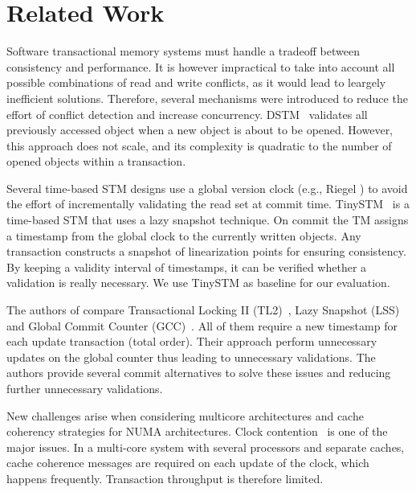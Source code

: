 \section{Related Work}

Software transactional memory systems must handle a tradeoff between consistency and performance.
It is however impractical to take into account all possible combinations of read and write conflicts, as it would lead to leargely inefficient solutions. 
Therefore, several mechanisms were introduced to reduce the effort of conflict detection and increase concurrency. 
DSTM~\cite{herlihy2003software} validates all previously accessed object when a new object is about to be opened. 
However, this approach does not scale, and its complexity is quadratic to the number of opened objects within a transaction.

Several time-based STM designs use a global version clock (e.g., Riegel \cite{riegel2006lazy}) to avoid the effort of incrementally validating the read set at commit time. 
TinySTM~\cite{FelberFMR10} is a time-based STM that uses a lazy snapshot technique. 
On commit the TM assigns a timestamp from the global clock to the currently written objects. 
Any transaction constructs a snapshot of linearization points for ensuring consistency. 
By keeping a validity interval of timestamps, it can be verified whether a validation is really necessary. 
We use TinySTM as baseline for our evaluation.

The authors of \cite{zhang2008commit} compare Transactional Locking II (TL2)~\cite{dice2006transactional}, Lazy Snapshot (LSS)\cite{riegel2006lazy} and Global Commit Counter (GCC)~\cite{spear2006conflict}. 
All of them require a new timestamp for each update transaction (total order).
Their approach perform unnecessary updates on the global counter thus leading to unnecessary validations. 
The authors provide several commit alternatives to solve these issues and reducing further unnecessary validations.

New challenges arise when considering multicore architectures and cache coherency strategies for NUMA architectures. 
Clock contention~\cite{6121290} is one of the major issues. 
In a multi-core system with several processors and separate caches, cache coherence messages are required on each update of the clock, which happens frequently. 
Transaction throughput is therefore limited.

